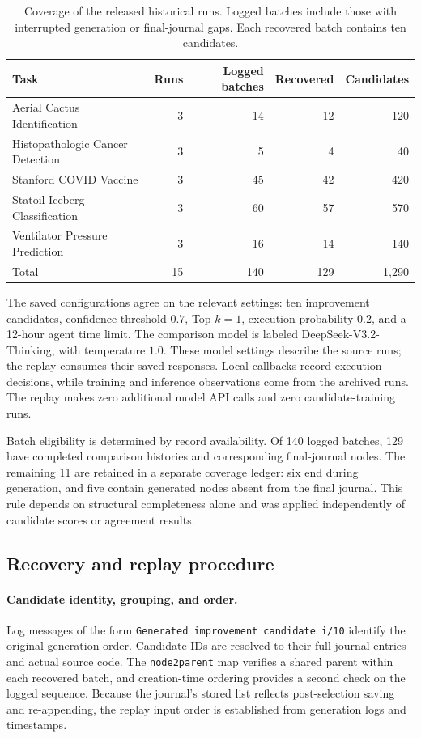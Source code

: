 \begin{table}[htbp]
  \centering
  \caption{Coverage of the released historical runs. Logged batches include those with interrupted generation or final-journal gaps. Each recovered batch contains ten candidates.}
  \label{tab:coverage}
  \small
  \begin{tabular}{lrrrr}
    \toprule
    Task & Runs & Logged batches & Recovered & Candidates \\
    \midrule
    Aerial Cactus Identification & 3 & 14 & 12 & 120 \\
    Histopathologic Cancer Detection & 3 & 5 & 4 & 40 \\
    Stanford COVID Vaccine & 3 & 45 & 42 & 420 \\
    Statoil Iceberg Classification & 3 & 60 & 57 & 570 \\
    Ventilator Pressure Prediction & 3 & 16 & 14 & 140 \\
    \midrule
    Total & 15 & 140 & 129 & 1,290 \\
    \bottomrule
  \end{tabular}
\end{table}

The saved configurations agree on the relevant settings: ten improvement candidates, confidence threshold $0.7$, Top-$k=1$, execution probability $0.2$, and a 12-hour agent time limit. The comparison model is labeled DeepSeek-V3.2-Thinking, with temperature $1.0$. These model settings describe the source runs; the replay consumes their saved responses. Local callbacks record execution decisions, while training and inference observations come from the archived runs. The replay makes zero additional model API calls and zero candidate-training runs.

Batch eligibility is determined by record availability. Of 140 logged batches, 129 have completed comparison histories and corresponding final-journal nodes. The remaining 11 are retained in a separate coverage ledger: six end during generation, and five contain generated nodes absent from the final journal. This rule depends on structural completeness alone and was applied independently of candidate scores or agreement results.

\subsection{Recovery and replay procedure}

\paragraph{Candidate identity, grouping, and order.}
Log messages of the form \texttt{Generated improvement candidate i/10} identify the original generation order. Candidate IDs are resolved to their full journal entries and actual source code. The \texttt{node2parent} map verifies a shared parent within each recovered batch, and creation-time ordering provides a second check on the logged sequence. Because the journal's stored list reflects post-selection saving and re-appending, the replay input order is established from generation logs and timestamps.

